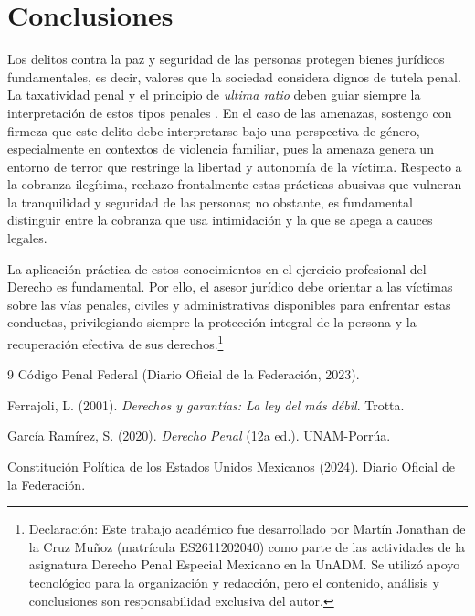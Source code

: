 \documentclass[12pt,spanish,letterpaper,oneside]{article}
\begin{document}
\clearpage
\section{Conclusiones}

Los delitos contra la paz y seguridad de las personas protegen bienes jur\'idicos fundamentales, es decir, valores que la sociedad considera dignos de tutela penal. La taxatividad penal y el principio de \emph{ultima ratio} deben guiar siempre la interpretaci\'on de estos tipos penales \citep{cpf2023}. En el caso de las amenazas, sostengo con firmeza que este delito debe interpretarse bajo una perspectiva de g\'enero, especialmente en contextos de violencia familiar, pues la amenaza genera un entorno de terror que restringe la libertad y autonom\'ia de la v\'ictima. Respecto a la cobranza ileg\'itima, rechazo frontalmente estas pr\'acticas abusivas que vulneran la tranquilidad y seguridad de las personas; no obstante, es fundamental distinguir entre la cobranza que usa intimidaci\'on y la que se apega a cauces legales.

La aplicaci\'on pr\'actica de estos conocimientos en el ejercicio profesional del Derecho es fundamental. Por ello, el asesor jur\'idico debe orientar a las v\'ictimas sobre las v\'ias penales, civiles y administrativas disponibles para enfrentar estas conductas, privilegiando siempre la protecci\'on integral de la persona y la recuperaci\'on efectiva de sus derechos.\footnote{Declaraci\'on: Este trabajo acad\'emico fue desarrollado por Mart\'in Jonathan de la Cruz Mu\~noz (matr\'icula ES2611202040) como parte de las actividades de la asignatura Derecho Penal Especial Mexicano en la UnADM. Se utiliz\'o apoyo tecnol\'ogico para la organizaci\'on y redacci\'on, pero el contenido, an\'alisis y conclusiones son responsabilidad exclusiva del autor.}

\clearpage
\begin{thebibliography}{9}
C\'odigo Penal Federal (Diario Oficial de la Federaci\'on, 2023).

Ferrajoli, L. (2001). \textit{Derechos y garant\'ias: La ley del m\'as d\'ebil}. Trotta.

Garc\'ia Ram\'irez, S. (2020). \textit{Derecho Penal} (12a ed.). UNAM-Porr\'ua.

Constituci\'on Pol\'itica de los Estados Unidos Mexicanos (2024). Diario Oficial de la Federaci\'on.
\end{thebibliography}
\end{document}
